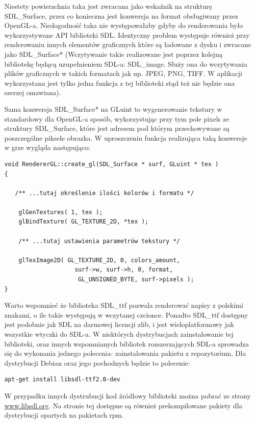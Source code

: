 Niestety powierzchnia taka jest zwracana jako wskaźnik na strukturę SDL\_Surface, przez co konieczna jest konwersja na format obsługiwany przez OpenGL-a. Niedogodność taka nie występowałaby gdyby do renderowania było wykorzystywane API biblioteki SDL. Identyczny problem występuje również przy renderowaniu innych elementów graficznych które są ładowane z dysku i zwracane jako SDL\_Surface* (Wczytywanie takie realizowane jest poprzez kolejną bibliotekę będącą uzupełnieniem SDL-a: SDL\_image. Służy ona do wczytywania plików graficznych w takich formatach jak np. JPEG, PNG, TIFF. W aplikacji wykorzystana jest tylko jedna funkcja 
z tej biblioteki stąd też nie będzie ona szerzej omawiana).

Sama konwersja SDL\_Surface* na GLuint to wygenerowanie tekstury w standardowy dla OpenGL-a sposób, wykorzystując przy tym pole pixels ze struktury SDL\_Surface, które jest adresem pod którym przechowywane są poszczególne piksele obrazka. W uproszczeniu funkcja realizująca taką konwersje w grze wygląda następująco:

\begingroup
\fontsize{10pt}{12pt}\selectfont
\begin{verbatim}  
void RendererGL::create_gl(SDL_Surface * surf, GLuint * tex )
{
 
   /** ...tutaj określenie ilości kolorów i formatu */
  
    glGenTextures( 1, tex );
    glBindTexture( GL_TEXTURE_2D, *tex );

    /** ...tutaj ustawienia parametrów tekstury */

    glTexImage2D( GL_TEXTURE_2D, 0, colors_amount,
    			  	surf->w, surf->h, 0, format, 
    			 	 GL_UNSIGNED_BYTE, surf->pixels );
}
\end{verbatim}
\endgroup

Warto wspomnieć że biblioteka SDL\_ttf pozwala renderować napisy z polskimi znakami, o ile takie występują w wczytanej czcionce. Ponadto SDL\_ttf dostępny jest podobnie jak SDL na darmowej licencji zlib, i jest wieloplatformowy jak wszystkie wtyczki do SDL-a. W niektórych dystrybucjach zainstalowanie tej biblioteki, oraz innych wspomnianych bibliotek rozszerzających SDL-a sprowadza się do wykonania jednego polecenia- zainstalowania pakietu z repozytorium. Dla dystrybucji Debian oraz jego pochodnych będzie to polecenie:
\begin{verbatim}
apt-get install libsdl-ttf2.0-dev 
\end{verbatim}

W przypadku innych dystrubucji kod źródłowy biblioteki można pobrać ze strony
\href{http://www.libsdl.org/projects/SDL_ttf/}{www.libsdl.org}.
Na stronie tej dostępne są również prekompilowane pakiety dla dystrybucji opartych na pakietach rpm.